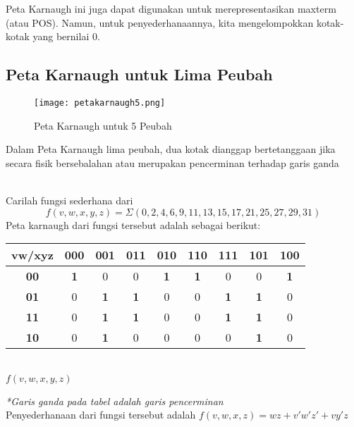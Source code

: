 \documentclass[11pt]{article}
\theoremstyle{definitionstyle}
\theoremstyle{theoremstyle}
\theoremstyle{examplestyle}
\begin{document}
Peta Karnaugh ini juga dapat digunakan untuk merepresentasikan maxterm (atau POS). Namun, untuk penyederhanaannya, kita mengelompokkan kotak-kotak yang bernilai 0.

\subsection{Peta Karnaugh untuk Lima Peubah}
\begin{figure}[h]
    \centering
    \texttt{[image: petakarnaugh5.png]}
    \caption{Peta Karnaugh untuk 5 Peubah}
\end{figure}
Dalam Peta Karnaugh lima peubah, dua kotak dianggap bertetanggaan jika secara fisik bersebalahan atau merupakan pencerminan terhadap garis ganda
\begin{example} \hfill \\
    Carilah fungsi sederhana dari 
    $$f(v, w, x, y, z) =  \Sigma(0, 2, 4, 6, 9, 11, 13, 15, 17, 21, 25, 27, 29, 31)$$
    Peta karnaugh dari fungsi tersebut adalah sebagai berikut:
    \begin{center}
        \begin{tabular}{|c|c|c|c|c||c|c|c|c|}
            \hline
            \textbf{vw/xyz} & \textbf{000} & \textbf{001} & \textbf{011} & \textbf{010} & \textbf{110} & \textbf{111} & \textbf{101} & \textbf{100} \\ \hline
            \textbf{00}     & \textbf{1}   & 0            & 0            & \textbf{1}   & \textbf{1}   & 0            & 0            & \textbf{1}   \\ \hline
            \textbf{01}     & 0            & \textbf{1}   & \textbf{1}   & 0            & 0            & \textbf{1}   & \textbf{1}   & 0            \\ \hline
            \textbf{11}     & 0            & \textbf{1}   & \textbf{1}   & 0            & 0            & \textbf{1}   & \textbf{1}   & 0            \\ \hline
            \textbf{10}     & 0            & \textbf{1}   & 0            & 0            & 0            & 0            & \textbf{1}   & 0            \\ \hline
        \end{tabular} \\
        $f(v, w, x, y, z)$
    \end{center}
    \textit{*Garis ganda pada tabel adalah garis pencerminan} \\
    Penyederhanaan dari fungsi tersebut adalah $f(v, w, x, z) = wz + v'w'z' + vy'z$
\end{example}
\pagebreak
\end{document}
